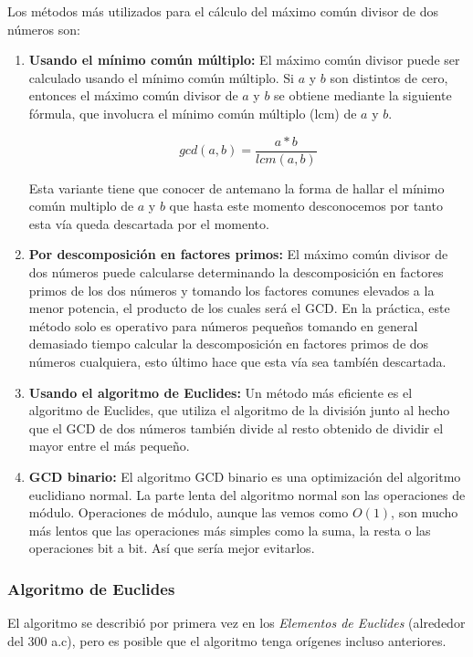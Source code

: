 Los métodos más utilizados para el cálculo del máximo común divisor de dos números son:

\begin{enumerate}
	\item \textbf{Usando el mínimo común múltiplo:} El máximo común divisor puede ser calculado usando el mínimo común múltiplo. Si $a$ y $b$ son distintos de cero, entonces el máximo común divisor de $a$ y $b$ se obtiene mediante la siguiente fórmula, que involucra el mínimo común múltiplo (lcm) de $a$ y $b$.
	
	$$ gcd(a,b)=\frac{a*b}{lcm(a,b)} $$
	
	Esta variante tiene que conocer de antemano la forma de hallar el mínimo común multiplo de $a$ y $b$ que hasta este momento desconocemos por tanto esta vía queda descartada por el momento.
	
	
	\item \textbf{Por descomposición en factores primos:}  El máximo común divisor de dos números puede calcularse determinando la descomposición en factores primos de los dos números y tomando los factores comunes elevados a la menor potencia, el producto de los cuales será el GCD. En la práctica, este método solo es operativo para números pequeños tomando en general demasiado tiempo calcular la descomposición en factores primos de dos números cualquiera, esto último hace que esta vía sea tambíén descartada.
	\item \textbf{Usando el algoritmo de Euclides:} Un método más eficiente es el algoritmo de Euclides, que utiliza el algoritmo de la división junto al hecho que el GCD de dos números también divide al resto obtenido de dividir el mayor entre el más pequeño.
	
	\item \textbf{GCD binario:} El algoritmo GCD binario es una optimización del algoritmo euclidiano normal. La parte lenta del algoritmo normal son las operaciones de módulo. Operaciones de módulo, aunque las vemos como $O(1)$, son mucho más lentos que las operaciones más simples como la suma, la resta o las operaciones bit a bit. Así que sería mejor evitarlos.
\end{enumerate}

\subsubsection{Algoritmo de Euclides}

El algoritmo se describió por primera vez en los \emph{Elementos de Euclides} (alrededor del 300 a.c), pero es posible que el algoritmo tenga orígenes incluso anteriores.

